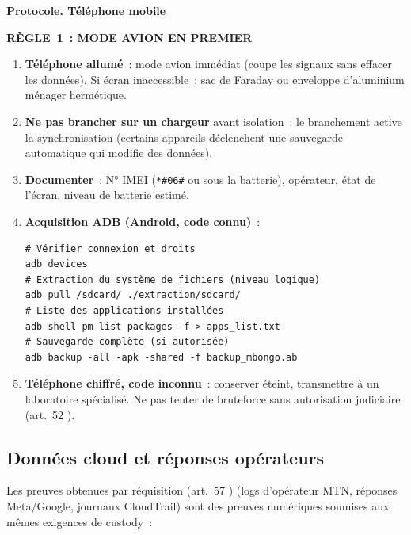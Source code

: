 \begin{boxPNC}
\textbf{Protocole. Téléphone mobile}

\begin{center}\textbf{RÈGLE~1~: MODE AVION EN PREMIER}\end{center}

\begin{enumerate}
    \item \textbf{Téléphone allumé}~: mode avion immédiat (coupe les signaux
          sans effacer les données). Si écran inaccessible~: sac de Faraday
          ou enveloppe d'aluminium ménager hermétique.
    \item \textbf{Ne pas brancher sur un chargeur} avant isolation~: le
          branchement active la synchronisation (certains appareils déclenchent
          une sauvegarde automatique qui modifie des données).
    \item \textbf{Documenter}~: N° IMEI (\texttt{*\#06\#} ou sous la batterie),
          opérateur, état de l'écran, niveau de batterie estimé.
    \item \textbf{Acquisition ADB (Android, code connu)}~:
          \begin{lstlisting}[language=bash_forensique]
# Vérifier connexion et droits
adb devices
# Extraction du système de fichiers (niveau logique)
adb pull /sdcard/ ./extraction/sdcard/
# Liste des applications installées
adb shell pm list packages -f > apps_list.txt
# Sauvegarde complète (si autorisée)
adb backup -all -apk -shared -f backup_mbongo.ab
          \end{lstlisting}
    \item \textbf{Téléphone chiffré, code inconnu}~: conserver éteint,
          transmettre à un laboratoire spécialisé. Ne pas tenter de bruteforce
          sans autorisation judiciaire (art.~52 ).
\end{enumerate}
\end{boxPNC}

\subsection{Données cloud et réponses opérateurs}

Les preuves obtenues par réquisition (art.~57 ) (logs
d'opérateur MTN, réponses Meta/Google, journaux CloudTrail) sont
des preuves numériques soumises aux mêmes exigences de custody~:

